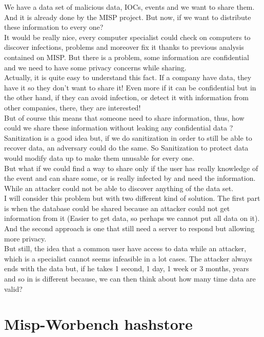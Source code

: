 \documentclass{eplmastersthesis}
\begin{document}
We have a data set of malicious data, IOCs, events and we want to share them. And it is already done by the MISP project. But now, if we want to distribute these information to every one?\\
It would be really nice, every computer specialist could check on computers to discover infections, problems and moreover fix it thanks to previous analysis contained on MISP. But there is a problem, some information are confidential and we need to have some privacy concerns while sharing. \\
Actually, it is quite easy to understand this fact. If a company have data, they have it so they don't want to share it! Even more if it can be confidential but in the other hand, if they can avoid infection, or detect it with information from other companies, there, they are interested! \\
But of course this means that someone need to share information, thus, how could we share these information without leaking any confidential data ?\\
Sanitization is a good idea but, if we do sanitization in order to still be able to recover data, an adversary could do the same. So Sanitization to protect data would modify data up to make them unusable for every one.\\
But what if we could find a way to share only if the user has really knowledge of the event and can share some, or is really infected by and need the information. While an attacker could not be able to discover anything of the data set.\\
I will consider this problem but with two different kind of solution. The first part is when the database could be shared because an attacker could not get information from it (Easier to get data, so perhaps we cannot put all data on it).\\
And the second approach is one that still need a server to respond but allowing more privacy.\\

But still, the idea that a common user have access to data while an attacker, which is a specialist cannot seems infeasible in a lot cases. The attacker always ends with the data but, if he takes 1 second, 1 day, 1 week or 3 months, years and so in is different because, we can then think about how many time data are valid? \\


\section{Misp-Worbench hashstore}
\end{document}
